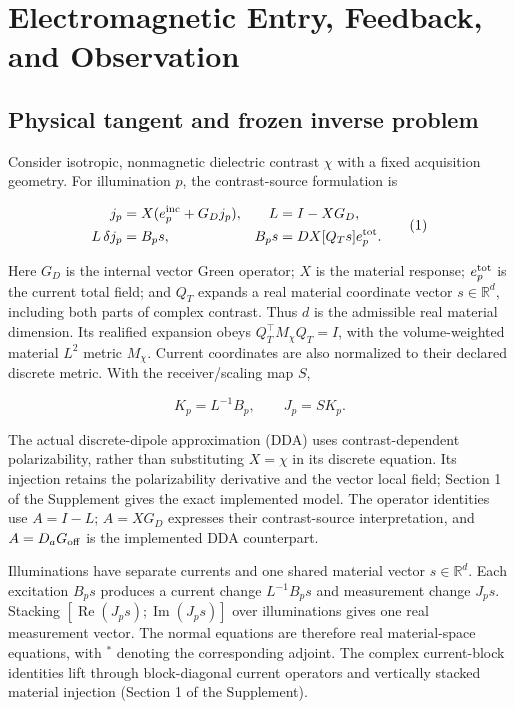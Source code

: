 \section{Electromagnetic Entry, Feedback, and Observation}

\subsection{Physical tangent and frozen inverse problem}

Consider isotropic, nonmagnetic dielectric contrast \(\chi\) with a fixed acquisition geometry. For illumination \(p\), the contrast-source formulation is

\[
\begin{aligned}
j_p&=X(e_p^{\rm inc}+G_Dj_p),&
L&=I-XG_D,\\
L\,\delta j_p&=B_ps,&
B_ps&=DX[Q_Ts]e_p^{\rm tot}.
\end{aligned}\tag{1}
\]

Here \(G_D\) is the internal vector Green operator; \(X\) is the material response; \(e_p^{\rm tot}\) is the current total field; and \(Q_T\) expands a real material coordinate vector \(s\in\mathbb R^d\), including both parts of complex contrast. Thus \(d\) is the admissible real material dimension. Its realified expansion obeys \(Q_T^\top M_\chi Q_T=I\), with the volume-weighted material \(L^2\) metric \(M_\chi\). Current coordinates are also normalized to their declared discrete metric. With the receiver/scaling map \(S\),

\[
K_p=L^{-1}B_p,\qquad J_p=SK_p. \tag{2}
\]

The actual discrete-dipole approximation (DDA) uses contrast-dependent polarizability, rather than substituting \(X=\chi\) in its discrete equation. Its injection retains the polarizability derivative and the vector local field; Section 1 of the Supplement gives the exact implemented model. The operator identities use \(A=I-L\); \(A=XG_D\) expresses their contrast-source interpretation, and \(A=D_aG_{\rm off}\) is the implemented DDA counterpart.

Illuminations have separate currents and one shared material vector $s\in\mathbb R^d$. Each excitation $B_ps$ produces a current change $L^{-1}B_ps$ and measurement change $J_ps$. Stacking $[\operatorname{Re}(J_ps);\operatorname{Im}(J_ps)]$ over illuminations gives one real measurement vector. The normal equations are therefore real material-space equations, with $^*$ denoting the corresponding adjoint. The complex current-block identities lift through block-diagonal current operators and vertically stacked material injection (Section 1 of the Supplement).

